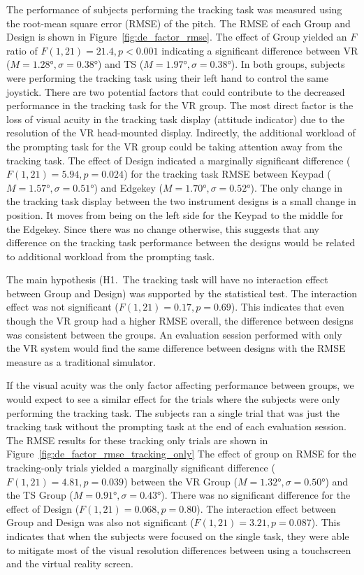 The performance of subjects performing the tracking task was measured using the root-mean square error (RMSE) of the pitch.
The RMSE of each Group and Design is shown in Figure~\ref{fig:de_factor_rmse}.
The effect of Group yielded an $F$ ratio of $F(1, 21) = 21.4, p < 0.001$ indicating a significant difference between VR ($M=\ang{1.28}, \sigma=\ang{0.38}$) and TS ($M=\ang{1.97}, \sigma=\ang{0.38}$).
In both groups, subjects were performing the tracking task using their left hand to control the same joystick.
There are two potential factors that could contribute to the decreased performance in the tracking task for the VR group.
The most direct factor is the loss of visual acuity in the tracking task display (attitude indicator) due to the resolution of the VR head-mounted display.
Indirectly, the additional workload of the prompting task for the VR group could be taking attention away from the tracking task.
The effect of Design indicated a marginally significant difference ($F(1, 21) = 5.94, p=0.024$) for the tracking task RMSE between Keypad ($M=\ang{1.57}, \sigma=\ang{0.51}$) and Edgekey ($M=\ang{1.70}, \sigma=\ang{0.52}$).
The only change in the tracking task display between the two instrument designs is a small change in position.
It moves from being on the left side for the Keypad to the middle for the Edgekey.
Since there was no change otherwise, this suggests that any difference on the tracking task performance between the designs would be related to additional workload from the prompting task.

The main hypothesis (H1.\ The tracking task will have no interaction effect between Group and Design) was supported by the statistical test.
The interaction effect was not significant ($F(1, 21) = 0.17, p=0.69$).
This indicates that even though the VR group had a higher RMSE overall, the difference between designs was consistent between the groups.
An evaluation session performed with only the VR system would find the same difference between designs with the RMSE measure as a traditional simulator.

If the visual acuity was the only factor affecting performance between groups, we would expect to see a similar effect for the trials where the subjects were only performing the tracking task.
The subjects ran a single trial that was just the tracking task without the prompting task at the end of each evaluation session.
The RMSE results for these tracking only trials are shown in Figure~\ref{fig:de_factor_rmse_tracking_only}
The effect of group on RMSE for the tracking-only trials yielded a marginally significant difference ($F(1, 21) = 4.81, p = 0.039$) between the VR Group ($M=\ang{1.32}, \sigma=\ang{0.50}$) and the TS Group ($M=\ang{0.91}, \sigma=\ang{0.43}$).
There was no significant difference for the effect of Design ($F(1,21) = 0.068, p=0.80$).
The interaction effect between Group and Design was also not significant ($F(1,21) = 3.21, p=0.087$).
This indicates that when the subjects were focused on the single task, they were able to mitigate most of the visual resolution differences between using a touchscreen and the virtual reality screen.

